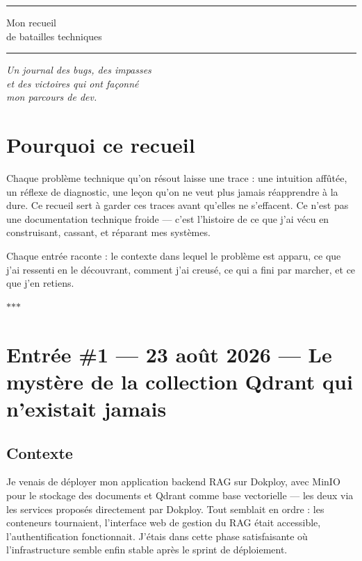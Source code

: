 \documentclass[10pt,twoside,openany]{article}
\newcommand{\entryrule}{\par\vspace{1.2em}\begin{center}\color{accentblue}$\ast$\quad$\ast$\quad$\ast$\end{center}\par}
\begin{document}
\begin{titlepage}
  \centering
  \vspace*{0.22\textheight}
  {\color{accentblue}\rule{\linewidth}{0.4pt}\par}
  \vspace{1.2em}
  {\LARGE\color{accentblue} Mon recueil\\[0.3em] de batailles techniques\par}
  \vspace{1.2em}
  {\color{accentblue}\rule{\linewidth}{0.4pt}\par}
  \vspace{2em}
  {\itshape Un journal des bugs, des impasses\\ et des victoires qui ont façonné\\ mon parcours de dev.\par}
  \vfill
\end{titlepage}

\renewcommand{\contentsname}{Sommaire}
\tableofcontents
\thispagestyle{empty}

\section*{Pourquoi ce recueil}

Chaque problème technique qu'on résout laisse une trace : une intuition affûtée, un réflexe de diagnostic, une leçon qu'on ne veut plus jamais réapprendre à la dure. Ce recueil sert à garder ces traces avant qu'elles ne s'effacent. Ce n'est pas une documentation technique froide — c'est l'histoire de ce que j'ai vécu en construisant, cassant, et réparant mes systèmes.

Chaque entrée raconte : le contexte dans lequel le problème est apparu, ce que j'ai ressenti en le découvrant, comment j'ai creusé, ce qui a fini par marcher, et ce que j'en retiens.

\entryrule


\section{Entrée \#1 --- 23 août 2026 --- Le mystère de la collection Qdrant qui n'existait jamais}

\subsection*{Contexte}
Je venais de déployer mon application backend RAG sur Dokploy, avec MinIO pour le stockage des documents et Qdrant comme base vectorielle — les deux via les services proposés directement par Dokploy. Tout semblait en ordre : les conteneurs tournaient, l'interface web de gestion du RAG était accessible, l'authentification fonctionnait. J'étais dans cette phase satisfaisante où l'infrastructure semble enfin stable après le sprint de déploiement.
\end{document}
